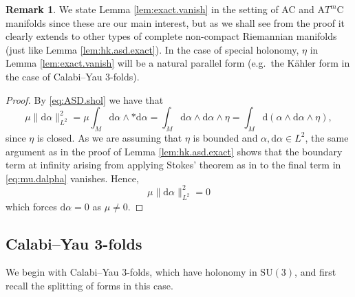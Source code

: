 \documentclass{article}
\theoremstyle{definition}
\newtheorem{rmk}[thm]{Remark}
\numberwithin{thm}{section}
\numberwithin{equation}{section}
\def\d{\mathrm{d}}
\begin{document}
\begin{rmk}\label{rmk:vanish}
    We state Lemma \ref{lem:exact.vanish} in the setting of AC and A$T^m$C manifolds since these are our main interest, but as we shall see from the proof it clearly extends to other types of complete non-compact Riemannian manifolds (just like Lemma \ref{lem:hk.asd.exact}).  In the case of special holonomy, $\eta$ in Lemma \ref{lem:exact.vanish} will be a natural parallel form (e.g.~the K\"ahler form in the case of Calabi--Yau 3-folds).
\end{rmk} 

\begin{proof}
By \eqref{eq:ASD.shol} we have that
\begin{equation}\label{eq:mu.dalpha}
    \mu\|\d\alpha\|_{L^2}^2=\mu\int_M\d\alpha\wedge *\d\alpha=\int_M\d\alpha\wedge\d\alpha\wedge\eta=\int_M\d(\alpha\wedge\d\alpha\wedge\eta),
\end{equation}
since $\eta$ is closed.  As we are assuming that $\eta$ is bounded and $\alpha,\d\alpha\in L^2$, the same argument as in the proof of Lemma \ref{lem:hk.asd.exact} shows that the boundary term at infinity arising from applying Stokes' theorem as in \cite{Gaffney} to the final term in  \eqref{eq:mu.dalpha} vanishes.  Hence, 
\begin{equation}
    \mu\|\d\alpha\|_{L^2}^2=0
\end{equation}
which forces $\d\alpha=0$ as $\mu\neq 0$.
\end{proof}


\subsection{Calabi--Yau 3-folds}

We begin with Calabi--Yau 3-folds, which have holonomy in $\mathrm{SU}(3)$, and first recall the splitting of forms in this case.
\end{document}
